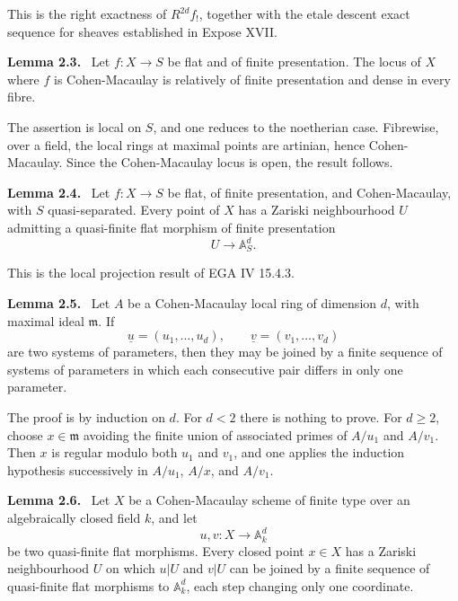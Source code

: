 \documentclass[12pt]{article}
\newenvironment{statement}[1]{\par\medskip\noindent\textbf{#1.}\ }{\par\medskip}
\begin{document}
This is the right exactness of \(R^{2d}f_!\), together with the etale descent exact sequence for sheaves established in Expose XVII.

\begin{statement}{Lemma 2.3}
Let \(f:X\to S\) be flat and of finite presentation. The locus of \(X\) where \(f\) is Cohen-Macaulay is relatively of finite presentation and dense in every fibre.
\end{statement}

The assertion is local on \(S\), and one reduces to the noetherian case. Fibrewise, over a field, the local rings at maximal points are artinian, hence Cohen-Macaulay. Since the Cohen-Macaulay locus is open, the result follows.

\begin{statement}{Lemma 2.4}
Let \(f:X\to S\) be flat, of finite presentation, and Cohen-Macaulay, with \(S\) quasi-separated. Every point of \(X\) has a Zariski neighbourhood \(U\) admitting a quasi-finite flat morphism of finite presentation
\[
U\to\mathbb A^d_S.
\]
\end{statement}

This is the local projection result of EGA IV 15.4.3.

\begin{statement}{Lemma 2.5}
Let \(A\) be a Cohen-Macaulay local ring of dimension \(d\), with maximal ideal \(\mathfrak m\). If
\[
\underline u=(u_1,\ldots,u_d),\qquad
\underline v=(v_1,\ldots,v_d)
\]
are two systems of parameters, then they may be joined by a finite sequence of systems of parameters in which each consecutive pair differs in only one parameter.
\end{statement}

The proof is by induction on \(d\). For \(d<2\) there is nothing to prove. For \(d\geq2\), choose \(x\in\mathfrak m\) avoiding the finite union of associated primes of \(A/u_1\) and \(A/v_1\). Then \(x\) is regular modulo both \(u_1\) and \(v_1\), and one applies the induction hypothesis successively in \(A/u_1\), \(A/x\), and \(A/v_1\).

\begin{statement}{Lemma 2.6}
Let \(X\) be a Cohen-Macaulay scheme of finite type over an algebraically closed field \(k\), and let
\[
u,v:X\to\mathbb A^d_k
\]
be two quasi-finite flat morphisms. Every closed point \(x\in X\) has a Zariski neighbourhood \(U\) on which \(u|U\) and \(v|U\) can be joined by a finite sequence of quasi-finite flat morphisms to \(\mathbb A^d_k\), each step changing only one coordinate.
\end{statement}
\end{document}
